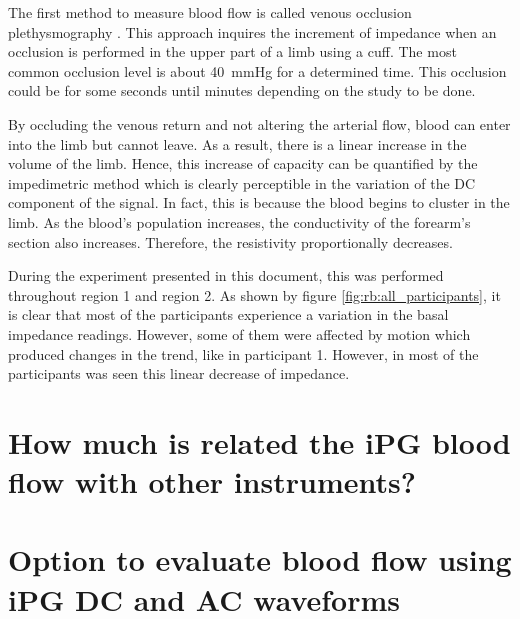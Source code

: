 The first method to measure blood flow is called venous occlusion plethysmography \cite{wilkinson2001venous}. This approach inquires the increment of impedance when an occlusion is performed in the upper part of a limb using a cuff. The most common occlusion level is about \SI{40}{\mmHg} for a determined time. This occlusion could be for some seconds until minutes depending on the study to be done. 

By occluding the venous return and not altering the arterial flow, blood can enter into the limb but cannot leave.  As a result, there is a linear increase in the volume of the limb. Hence, this increase of capacity can be quantified by the impedimetric method which is clearly perceptible in the variation of the DC component of the signal. In fact, this is because the blood begins to cluster in the limb. As the blood's population increases, the conductivity of the forearm's section also increases. Therefore, the resistivity proportionally decreases. 

During the experiment presented in this document, this was performed throughout region 1 and region 2.  As shown by figure \ref{fig:rb:all_participants}, it is clear that most of the participants experience a variation in the basal impedance readings.  However, some of them were affected by motion which produced changes in the trend, like in participant 1. However, in most of the participants was seen this linear decrease of impedance.  

\section{How much is related the iPG blood flow with other instruments?} %
\label{section discussion 4}

\section{Option to evaluate blood flow using iPG DC and AC waveforms}  %
\label{section discussion 3}

